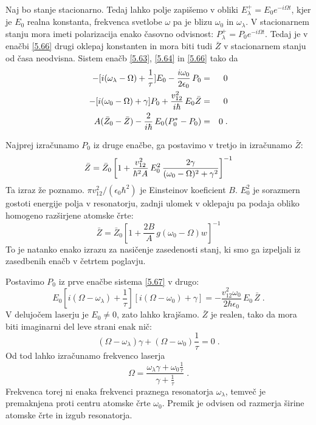 Naj bo stanje stacionarno. Tedaj lahko polje zapišemo v obliki $E_{\lambda
}^{+}=E_{0}e^{-i\Omega t}$, kjer je $E_{0}$ realna konstanta, frekvenca
svetlobe $\omega $ pa je blizu $\omega _{0}$ in $\omega _{\lambda }$. V
stacionarnem stanju mora imeti polarizacija enako časovno odvisnost: $%
P_{\lambda }^{+}=P_{0}e^{-i\Omega t}$. Tedaj je v enačbi \ref{5.66} drugi
oklepaj konstanten in mora biti tudi $\bar{Z}$ v stacionarnem stanju od
časa neodvisna. Sistem enačb \ref{5.63}, \ref{5.64} in \ref{5.66} 
tako da 
\begin{eqnarray}
-[i(\omega _{\lambda }-\Omega )+\frac{1}{\tau }]E_{0}-\frac{i\omega _{0}}{%
2\epsilon _{0}}\,P_{0} &=&0  \nonumber  \label{5.67} \\
-[i(\omega _{0}-\Omega )+\gamma ]P_{0}+\frac{v_{12}^{2}}{i\hbar }\,E_{0}\bar{%
Z} &=&0  \nonumber \\
A(\bar{Z}_{0}-\bar{Z})-\frac{2}{i\hbar }\,E_{0}(P_{0}^{*}-P_{0}) &=&0\;.
\end{eqnarray}

Najprej izračunamo $P_0$ iz druge enačbe, ga postavimo v tretjo in
izračunamo $\bar{Z}$: 
\begin{equation}  \label{5.68}
\bar{Z}=\bar{Z}_0\left[1+\frac{v_{12}^2}{\hbar^2 A}\,E_0^2\, \frac{2\gamma}{%
(\omega_0-\Omega)^2+\gamma^2}\right]^{-1}
\end{equation}
Ta izraz že poznamo. $\pi v_{12}^2/(\epsilon_0\hbar^2)$ je Einsteinov
koeficient $B$. $E_0^2$ je sorazmern gostoti energije polja v resonatorju,
zadnji ulomek v oklepaju pa podaja obliko homogeno razširjene atomske
črte: 
\begin{equation}  \label{5.69}
\bar{Z}=\bar{Z}_0\left[1+\frac{2B}{A}\,g(\omega_0- \Omega)w\right]^{-1}
\end{equation}
To je natanko enako izrazu za nasičenje zasedenosti stanj, ki smo ga
izpeljali iz zasedbenih enačb v četrtem poglavju.

Postavimo $P_0$ iz prve enačbe sistema \ref{5.67} v drugo: 
\begin{equation}  \label{5.70}
E_0[i(\Omega-\omega_{\lambda})+\frac{1}{\tau}] [i(\Omega- \omega_0)
+\gamma]=-\frac{v_{12}^2 \omega_0}{2\hbar\epsilon_0}\,E_0\,\bar{Z}\;.
\end{equation}
V delujočem laserju je $E_0\ne 0$, zato lahko krajšamo. $\bar{Z}$ je
realen, tako da mora biti imaginarni del leve strani enak nič: 
\begin{equation}  \label{5.71}
(\Omega- \omega_{\lambda})\gamma+(\Omega- \omega_0)\frac{1}{\tau} = 0 \;.
\end{equation}
Od tod lahko izračunamo frekvenco laserja 
\begin{equation}  \label{5.72}
\Omega=\frac{\omega_{\lambda}\gamma+ \omega_0\frac{1}{\tau}}{\gamma + \frac{1%
}{\tau}}\;.
\end{equation}
Frekvenca torej ni enaka frekvenci praznega resonatorja $\omega_{\lambda}$,
temveč je premaknjena proti centru atomske črte $\omega_0$. Premik je
odvisen od razmerja širine atomske črte in izgub resonatorja.

